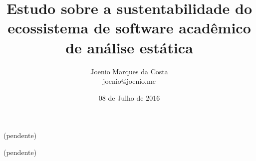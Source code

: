 \documentclass[msc, classic, a4paper]{ufbathesis}
\date{08 de Julho de 2016}
\title{
  Estudo sobre a sustentabilidade do ecossistema de software acadêmico de
  análise estática
}
\author{Joenio Marques da Costa\\
  {\small joenio@joenio.me}
}
\begin{document}
\frontpage
\frontmatter
\presentationpage

\resumo

(pendente)

\begin{keywords}

  (pendente)

\end{keywords}

\tableofcontents
\listoffigures
\listoftables

\mainmatter















\backmatter


\appendix




\end{document}
